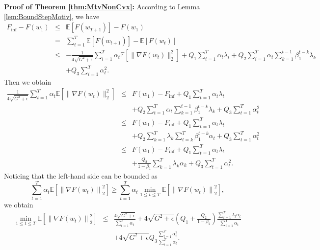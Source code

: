 \documentclass[twoside]{article}
\def\EE{\mathbb{E}}
\begin{document}
\textbf{Proof of Theorem \ref{thm:MtvNonCvx}:} According to Lemma \ref{lem:BoundStepMotiv}, we have
\begin{eqnarray}
F_{\mathrm{inf}} - F(w_1) &\leq& \EE[F(w_{T+1})] - F(w_1) \nonumber\\
&=& \sum_{t=1}^T \EE[F(w_{t+1})] - \EE[F(w_t)]\nonumber\\
&\leq& -\frac{1}{4\sqrt{G^2 + \epsilon}} \sum_{i=1}^T \alpha_t \EE\left[\|\nabla F(w_t)\|_2^2\right] + Q_1\sum_{i=1}^T \alpha_t\lambda_t + Q_2 \sum_{i=1}^T \alpha_t \sum_{k=1}^{t-1}\beta_1^{t-k}\lambda_k\nonumber\\
&& +Q_3 \sum_{i=1}^{T}\alpha_t^2.\nonumber
\end{eqnarray}
Then we obtain
\begin{eqnarray}
\frac{1}{4\sqrt{G^2+\epsilon}}\sum_{t=1}^T \alpha_t \EE\left[\|\nabla F(w_t)\|_2^2\right] &\leq& F(w_1) - F_{\mathrm{inf}} +Q_1 \sum_{t=1}^T \alpha_t\lambda_t \nonumber\\
&&+Q_2 \sum_{t=1}^T \alpha_t \sum_{k=1}^{t-1}\beta_1^{t-k}\lambda_k + Q_3\sum_{t=1}^T \alpha_t^2\nonumber\\
&\leq&F(w_1) - F_{\mathrm{inf}} +Q_1 \sum_{t=1}^T \alpha_t\lambda_t \nonumber\\
&&+Q_2 \sum_{k=1}^T \lambda_k \sum_{t=k}^{T}\beta_1^{t-k}\alpha_t +  Q_3\sum_{t=1}^T \alpha_t^2 \nonumber\\
&\leq &F(w_1) - F_{\mathrm{inf}} +Q_1 \sum_{t=1}^T \alpha_t\lambda_t \nonumber\\
&&+\frac{Q_2}{1-\beta_1} \sum_{k=1}^T \lambda_k \alpha_k +  Q_3\sum_{t=1}^T \alpha_t^2 .\nonumber
\end{eqnarray}
Noticing that the left-hand side can be bounded as
\begin{equation}
    \sum_{t=1}^T \alpha_t \EE\left[\left\|\nabla F(w_t)\right\|_2^2\right] \geq \sum_{t=1}^T \alpha_t \min_{1\leq t\leq T} \EE\left[\left\|\nabla F(w_t)\right\|_2^2\right],\nonumber
\end{equation}
we obtain
\begin{eqnarray}
\min_{1\leq t \leq T} \EE\left[\left\|\nabla F(w_t)\right\|_2^2\right] &\leq& \frac{4\sqrt{G^2+\epsilon}}{\sum_{t=1}^T \alpha_t} + 4\sqrt{G^2+\epsilon}\left(Q_1 + \frac{Q_2}{1-\beta_2}\right)\frac{\sum_{t=1}^T \lambda_t\alpha_t}{\sum_{t=1}^T\alpha_t}\nonumber\\
&&+ 4\sqrt{G^2+\epsilon} Q_3 \frac{\sum_{t=1}^T \alpha_t^2}{\sum_{t=1}^T \alpha_t}\nonumber.
\end{eqnarray}
\end{document}
